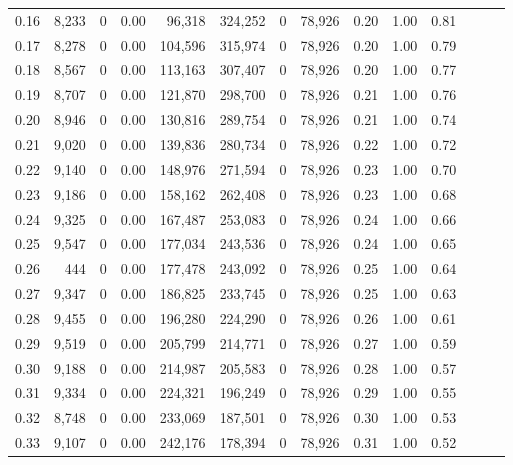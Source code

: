 \begin{tabular}{rrrrrrrrrrrrrr}
0.16 &   8,233 &      0 &  0.00 &   96,318 &  324,252 &       0 &  78,926 &  0.20 &  1.00 &      0.81 \\
0.17 &   8,278 &      0 &  0.00 &  104,596 &  315,974 &       0 &  78,926 &  0.20 &  1.00 &      0.79 \\
0.18 &   8,567 &      0 &  0.00 &  113,163 &  307,407 &       0 &  78,926 &  0.20 &  1.00 &      0.77 \\
0.19 &   8,707 &      0 &  0.00 &  121,870 &  298,700 &       0 &  78,926 &  0.21 &  1.00 &      0.76 \\
0.20 &   8,946 &      0 &  0.00 &  130,816 &  289,754 &       0 &  78,926 &  0.21 &  1.00 &      0.74 \\
0.21 &   9,020 &      0 &  0.00 &  139,836 &  280,734 &       0 &  78,926 &  0.22 &  1.00 &      0.72 \\
0.22 &   9,140 &      0 &  0.00 &  148,976 &  271,594 &       0 &  78,926 &  0.23 &  1.00 &      0.70 \\
0.23 &   9,186 &      0 &  0.00 &  158,162 &  262,408 &       0 &  78,926 &  0.23 &  1.00 &      0.68 \\
0.24 &   9,325 &      0 &  0.00 &  167,487 &  253,083 &       0 &  78,926 &  0.24 &  1.00 &      0.66 \\
0.25 &   9,547 &      0 &  0.00 &  177,034 &  243,536 &       0 &  78,926 &  0.24 &  1.00 &      0.65 \\
0.26 &     444 &      0 &  0.00 &  177,478 &  243,092 &       0 &  78,926 &  0.25 &  1.00 &      0.64 \\
0.27 &   9,347 &      0 &  0.00 &  186,825 &  233,745 &       0 &  78,926 &  0.25 &  1.00 &      0.63 \\
0.28 &   9,455 &      0 &  0.00 &  196,280 &  224,290 &       0 &  78,926 &  0.26 &  1.00 &      0.61 \\
0.29 &   9,519 &      0 &  0.00 &  205,799 &  214,771 &       0 &  78,926 &  0.27 &  1.00 &      0.59 \\
0.30 &   9,188 &      0 &  0.00 &  214,987 &  205,583 &       0 &  78,926 &  0.28 &  1.00 &      0.57 \\
0.31 &   9,334 &      0 &  0.00 &  224,321 &  196,249 &       0 &  78,926 &  0.29 &  1.00 &      0.55 \\
0.32 &   8,748 &      0 &  0.00 &  233,069 &  187,501 &       0 &  78,926 &  0.30 &  1.00 &      0.53 \\
0.33 &   9,107 &      0 &  0.00 &  242,176 &  178,394 &       0 &  78,926 &  0.31 &  1.00 &      0.52 \\

\end{tabular}
